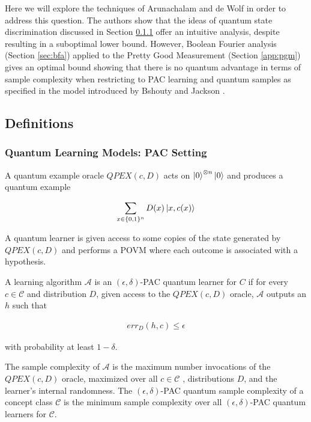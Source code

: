 \documentclass[main.tex]{subfiles}
\begin{document}
Here we will explore the techniques of Arunachalam and de Wolf \cite{arunachalam2016optimal} in order to address this question. The authors show that the ideas of quantum state discrimination discussed in Section \ref{} offer an intuitive analysis, despite resulting in a suboptimal lower bound. However, Boolean Fourier analysis (Section \ref{sec:bfa}) applied to the Pretty Good Measurement (Section \ref{app:pgm}) gives an optimal bound showing that there is no quantum advantage in terms of sample complexity when restricting to PAC learning and quantum samples as specified in the model introduced by Bshouty and Jackson \cite{bshouty1998learning}.

\subsection{Definitions}

\subsubsection{Quantum Learning Models: PAC Setting}

A quantum example oracle $QPEX(c,D)$ acts on $\ket{0}^{\otimes n}\ket{0}$ and produces a quantum example 

\begin{align}
\sum_{x\in\{0,1\}^n} D(x)\ket{x,c(x)}	
\end{align}

A quantum learner is given access to some copies of the state generated by $QPEX(c,D)$ and performs a POVM where each outcome is associated with a hypothesis. 

A learning algorithm $\mathcal{A}$ is an $(\epsilon, \delta)$-PAC quantum learner for $C$ if for every $c \in \mathcal{C}$ and distribution $D$, given access to the $QPEX(c,D)$ oracle, $\mathcal{A}$ outputs an $h$ such that 

\begin{align}
err_D (h, c) \leq \epsilon	
\end{align}

with probability at least $1 - \delta$.

The sample complexity of $\mathcal{A}$ is the maximum number invocations of the $QPEX(c,D)$ oracle, maximized over all $c \in \mathcal{C}$ , distributions $D$, and the learner’s internal randomness. The $(\epsilon, \delta)$-PAC quantum sample complexity of a concept class $\mathcal{C}$ is the minimum sample complexity over all $(\epsilon,\delta)$-PAC quantum learners for $\mathcal{C}$.
\end{document}
